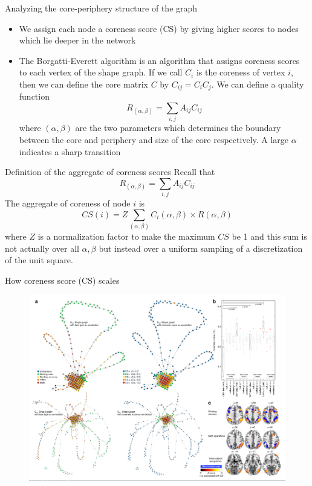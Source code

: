 \documentclass[handout]{beamer}
\begin{document}
\begin{frame}{Analyzing the core-periphery structure of the graph}
    \begin{itemize}
        \item We assign each node a coreness score (CS) by giving higher scores to nodes which lie deeper in the network
        \item The Borgatti-Everett algorithm is an algorithm that assigns coreness scores to each vertex of the shape graph. If we call $C_i$ is the coreness of vertex $i$, then we can define the core matrix $C$ by $C_{ij} = C_{i}C_j$. We can define a quality function \[R_{(\alpha,\beta)} = \sum_{i,j}A_{ij}C_{ij}\]where $(\alpha, \beta)$ are the two parameters which determines the boundary between the core and periphery and size of the core respectively. A large $\alpha$ indicates a sharp transition
    \end{itemize}
\end{frame}

\begin{frame}{Definition of the aggregate of coreness scores}
    Recall that
    \[R_{(\alpha,\beta)} = \sum_{i,j}A_{ij}C_{ij}\]
    The aggregate of coreness of node $i$ is \[CS(i) = Z \sum_{(\alpha, \beta)} C_i(\alpha, \beta) \times R(\alpha, \beta)\]where $Z$ is a normalization factor to make the maximum $CS$ be 1 and this sum is not actually over all $\alpha,\beta$ but instead over a uniform sampling of a discretization of the unit square.
\end{frame}

\begin{frame}{How coreness score (CS) scales}
    \begin{figure}
        \includegraphics[width = 0.85\linewidth]{fig4.png}
    \end{figure}
\end{frame}
\end{document}
